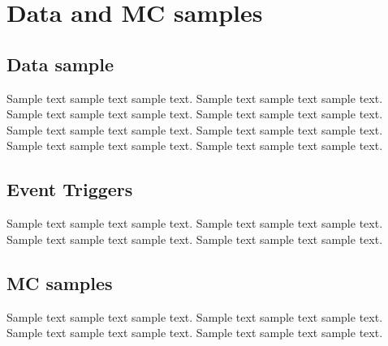 \chapter{Data and MC samples}
\label{ch:data-mc-samples}

\section{Data sample}
Sample text sample text sample text. Sample text sample text sample text.
Sample text sample text sample text. Sample text sample text sample text.
Sample text sample text sample text. Sample text sample text sample text.
Sample text sample text sample text. Sample text sample text sample text.

\section{Event Triggers}
Sample text sample text sample text. Sample text sample text sample text.
Sample text sample text sample text. Sample text sample text sample text.

\section{MC samples}
Sample text sample text sample text. Sample text sample text sample text.
Sample text sample text sample text. Sample text sample text sample text.
